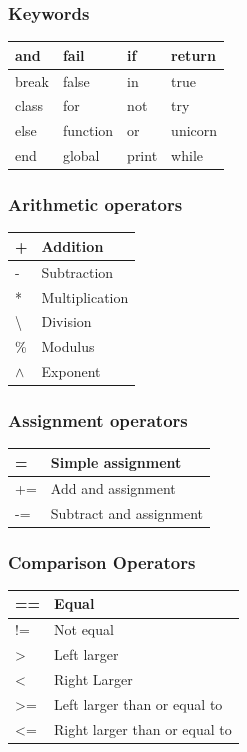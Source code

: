 \documentclass[a4paper,12pt]{article}
\begin{document}
\begin{multicols}{2}

  \subsubsection*{Keywords}
  \begin{tabular}{| l | l | l | l | } \hline
    and & fail & if & return \\ \hline
    break & false & in & true \\ \hline
    class & for & not & try \\ \hline
    else & function & or & unicorn \\ \hline
    end & global &  print & while \\ \hline
  \end{tabular}

  \subsubsection*{Arithmetic operators}
  \begin{tabular}{| l | l | } \hline
    + & Addition \\ \hline
    - & Subtraction \\ \hline
    * & Multiplication \\ \hline
    \textbackslash & Division \\ \hline
    \% & Modulus \\ \hline
    \(\wedge\)  & Exponent \\ \hline
  \end{tabular}

  \subsubsection*{Assignment operators}
  \begin{tabular}{| l | l | } \hline
    = & Simple assignment  \\ \hline
    += & Add and assignment  \\ \hline
    -= & Subtract and assignment  \\ \hline
  \end{tabular}

  \subsubsection*{Comparison Operators}
  \begin{tabular}{| l | l | } \hline
    == & Equal \\ \hline
    != & Not equal \\ \hline
    \textgreater & Left larger \\ \hline
    \textless & Right Larger \\ \hline
    \textgreater= & Left larger than or equal to \\ \hline
    \textless= & Right larger than or equal to \\ \hline
  \end{tabular}

\end{multicols}
\end{document}

